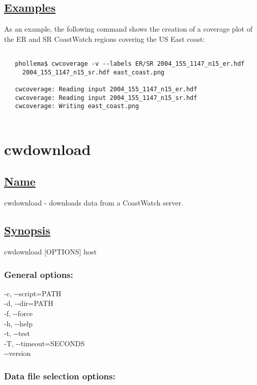 \subsection*{\underline{Examples}}


  As an example, the following command shows the creation of a coverage plot of the ER and SR CoastWatch regions covering the US East coast:
\begin{verbatim}

   phollema$ cwcoverage -v --labels ER/SR 2004_155_1147_n15_er.hdf 
     2004_155_1147_n15_sr.hdf east_coast.png
 
   cwcoverage: Reading input 2004_155_1147_n15_er.hdf
   cwcoverage: Reading input 2004_155_1147_n15_sr.hdf
   cwcoverage: Writing east_coast.png
 
\end{verbatim}

\newpage
\section{cwdownload} \hypertarget{cwdownload}{}
\subsection*{\underline{Name}}


   cwdownload - downloads data from a CoastWatch server.  
\subsection*{\underline{Synopsis}}


 cwdownload [OPTIONS] host
\subsubsection*{General options:}


  -c, -{-}script=PATH \\ 
 -d, -{-}dir=PATH \\ 
 -f, -{-}force \\ 
 -h, -{-}help \\ 
 -t, -{-}test \\ 
 -T, -{-}timeout=SECONDS \\ 
 -{-}version \\ 

\subsubsection*{Data file selection options:}


